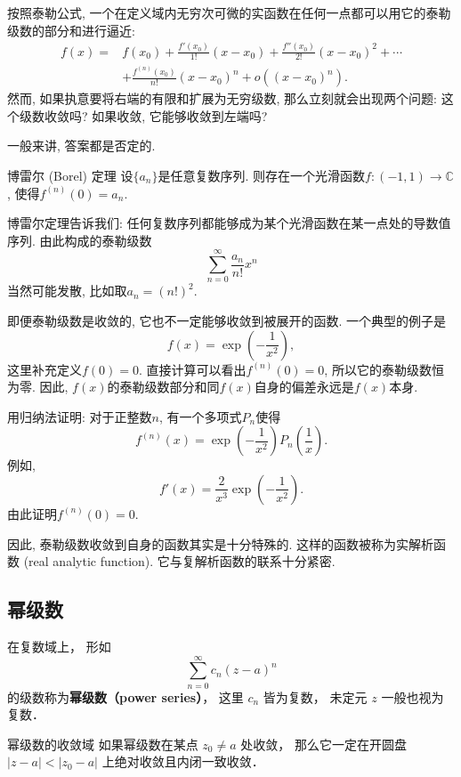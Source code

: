 

按照泰勒公式, 一个在定义域内无穷次可微的实函数在任何一点都可以用它的泰勒级数的部分和进行逼近:
$$
\begin{aligned}
f(x)=&f(x_0)+\frac{f'(x_0)}{1!}(x-x_0)+\frac{f''(x_0)}{2!}(x-x_0)^2+\cdots\\
&+\frac{f^{(n)}(x_0)}{n!}(x-x_0)^n+o((x-x_0)^n).
\end{aligned}
$$
然而, 如果执意要将右端的有限和扩展为无穷级数, 那么立刻就会出现两个问题: 这个级数收敛吗? 如果收敛, 它能够收敛到左端吗?

一般来讲, 答案都是否定的. 

\begin{theorem}{博雷尔 (Borel) 定理}
设$\{a_n\}$是任意复数序列. 则存在一个光滑函数$f:(-1,1)\to\mathbb{C}$, 使得$f^{(n)}(0)=a_n$.
\end{theorem}
博雷尔定理告诉我们: 任何复数序列都能够成为某个光滑函数在某一点处的导数值序列. 由此构成的泰勒级数
$$
\sum_{n=0}^\infty\frac{a_n}{n!}x^n
$$
当然可能发散, 比如取$a_n=(n!)^2$.

即便泰勒级数是收敛的, 它也不一定能够收敛到被展开的函数. 一个典型的例子是
$$
f(x)=\exp\left(-\frac{1}{x^2}\right),
$$
这里补充定义$f(0)=0$. 直接计算可以看出$f^{(n)}(0)=0$, 所以它的泰勒级数恒为零. 因此, $f(x)$的泰勒级数部分和同$f(x)$自身的偏差永远是$f(x)$本身.

\begin{exercise}{}
用归纳法证明: 对于正整数$n$, 有一个多项式$P_n$使得
$$
f^{(n)}(x)=\exp\left(-\frac{1}{x^2}\right)P_n\left(\frac{1}{x}\right).
$$
例如, 
$$
f'(x)=\frac{2}{x^3}\exp\left(-\frac{1}{x^2}\right).
$$
由此证明$f^{(n)}(0)=0$.
\end{exercise}

因此, 泰勒级数收敛到自身的函数其实是十分特殊的. 这样的函数被称为实解析函数 (real analytic function). 它与复解析函数的联系十分紧密.

\subsection{幂级数}
在复数域上， 形如
\begin{equation}
\sum_{n=0}^\infty c_n(z-a)^n
\end{equation}
的级数称为\textbf{幂级数（power series）}， 这里 $c_n$ 皆为复数， 未定元 $z$ 一般也视为复数． 

\begin{theorem}{幂级数的收敛域}
如果幂级数在某点 $z_0\neq a$ 处收敛， 那么它一定在开圆盘 $|z-a|<|z_0-a|$ 上绝对收敛且内闭一致收敛．
\end{theorem}

